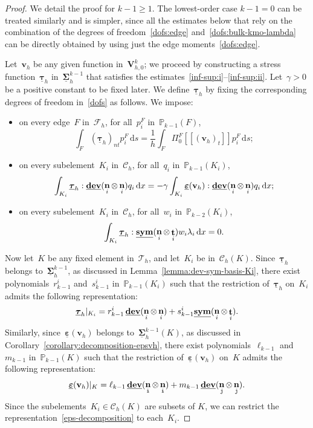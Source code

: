 \documentclass[10pt,a4paper]{amsart}
\newcommand{\Ccalh}{\mathcal{C}_h}
\newcommand{\CcalhK}{\Ccalh(\K)}
\newcommand{\F}{F}
\newcommand{\Fcalh}{\mathcal{F}_h}
\newcommand{\K}{K}
\newcommand{\Ki}{{\K_i}}
\newcommand{\Pbbkmo}{\mathbb{P}_{k-1}}
\newcommand{\Pbbkmt}{\mathbb{P}_{k-2}}
\newcommand{\PizF}{\Pi_0^{\F}}
\newcommand{\Sigmah}{\underline{\boldsymbol{\Sigma}}_h}
\newcommand{\Sigmahkmo}{\Sigmah^{k-1}}
\newcommand{\Tauh}{\mathcal{T}_h}
\newcommand{\Vbf}{\mathbf{V}}
\newcommand{\Vhkz}{\Vbf_{h,0}^k}
\DeclareMathOperator{\dev}{\underline{\mathbf{dev}}}
\newcommand{\ds}{\, \mathrm{d}s}
\newcommand{\dx}{\, \mathrm{d}x}
\newcommand{\epsbfun}{\underline{\boldsymbol{\varepsilon}}}
\newcommand{\itt}{\mathtt{i}}
\newcommand{\jtt}{\mathtt{j}}
\newcommand{\jump}[1]{\left[\!\left[#1\right]\!\right]}
\newcommand{\lambdai}{\lambda_i}
\newcommand{\lkmo}{\ell_{k-1}}
\newcommand{\mkmo}{m_{k-1}}
\DeclareMathOperator{\norm}{\bf{n}}
\newcommand{\normi}{\norm_i}
\newcommand{\normitt}{\norm_{\itt}}
\newcommand{\normjtt}{\norm_{\jtt}}
\newcommand{\normtang}{{nt}}
\newcommand{\piF}{p_{i}^F}
\newcommand{\qi}{q_{i}}
\newcommand{\rkmoi}{r_{k-1}^i}
\newcommand{\skmoi}{s_{k-1}^i}
\newcommand{\sym}{\underline{\bf{sym}}}
\DeclareMathOperator{\tang}{\bf{t}}
\newcommand{\tangi}{\tang_i}
\newcommand{\tangscalar}{t}
\newcommand{\taubfh}{\underline{\boldsymbol{\tau}}_h}
\newcommand{\vbfh}{\mathbf{v}_h}
\newcommand{\wi}{w_i}
\begin{document}
\begin{proof}
We detail the proof for $k-1 \geq 1$.
The lowest-order case $k-1 = 0$ can be treated similarly
and is simpler,
since all the estimates below that rely on the combination of
the degrees of freedom~\eqref{dofs:edge} and~\eqref{dofs:bulk-kmo-lambda}
can be directly obtained by using just the edge moments~\eqref{dofs:edge}.

Let~$\vbfh$ be any given function in~$\Vhkz$;
we proceed by constructing a stress function~$\taubfh$ in~$\Sigmahkmo$
that satisfies the estimates~\eqref{inf-sup:i}--\eqref{inf-sup:ii}.
Let~$\gamma > 0$ be a positive constant to be fixed later.
We define~$\taubfh$
by fixing the corresponding degrees of freedom in~\eqref{dofs} as follows.
We impose:
\begin{itemize}
\item on every edge~$\F$ in~$\Fcalh$, for all~$\piF$ in~$\Pbbkmo(\F)$,
\begin{equation}  \label{stability-dofs:1}
\int_{\F} (\taubfh)_{\normtang} \piF \ds = \frac{1}{h} \int_{\F} \PizF\jump{(\vbfh)_{\tangscalar}}\piF \ds;
\end{equation}
\item on every subelement~$\Ki$ in~$\Ccalh$, for all~$\qi$ in~$\Pbbkmo(\Ki)$,
\begin{equation} \label{stability-dofs:2}
\int_{\Ki} \taubfh : \dev(\normi\otimes\normi) \qi \dx = - \gamma\int_{\Ki} \epsbfun(\vbfh) : \dev(\normi\otimes\normi) \qi \dx;
\end{equation}
\item on every subelement~$\Ki$ in~$\Ccalh$, for all~$\wi$ in~$\Pbbkmt(\Ki)$,
\begin{equation} \label{stability-dofs:3}
\int_{\Ki} \taubfh : \sym(\normi\otimes\tangi)\wi\lambdai \dx = 0.
\end{equation}
\end{itemize}
Now let~$\K$ be any fixed element in~$\Tauh$,
and let~$\Ki$ be in~$\CcalhK$.
Since~$\taubfh$ belongs to~$\Sigmahkmo$,
as discussed in Lemma~\ref{lemma:dev-sym-basis-Ki},
there exist polynomials~$\rkmoi$ and~$\skmoi$ in~$\Pbbkmo(\Ki)$
such that the restriction of~$\taubfh$ on~$\Ki$
admits the following representation:
\begin{equation} \label{tau-decomposition}
\taubfh|_{\Ki} = \rkmoi\dev(\normi\otimes\normi) + \skmoi\sym(\normi\otimes\tangi).
\end{equation} 
Similarly,
since~$\epsbfun(\vbfh)$ belongs to~$\Sigmahkmo(\K)$,
as discussed in Corollary~\ref{corollary:decomposition-epsvh},
there exist polynomials~$\lkmo$ and $\mkmo$ in~$\Pbbkmo(\K)$
such that the restriction of~$\epsbfun(\vbfh)$ on~$\K$
admits the following representation:
\begin{equation} \label{eps-decomposition}
\epsbfun(\vbfh)|_{\K} = \lkmo\dev(\normitt\otimes\normitt) + \mkmo\dev(\normjtt\otimes\normjtt).
\end{equation}
Since the subelements~$\Ki \in \CcalhK$ are subsets of $\K$,
we can restrict the representation~\eqref{eps-decomposition}
to each~$\Ki$.


\end{proof}
\end{document}

